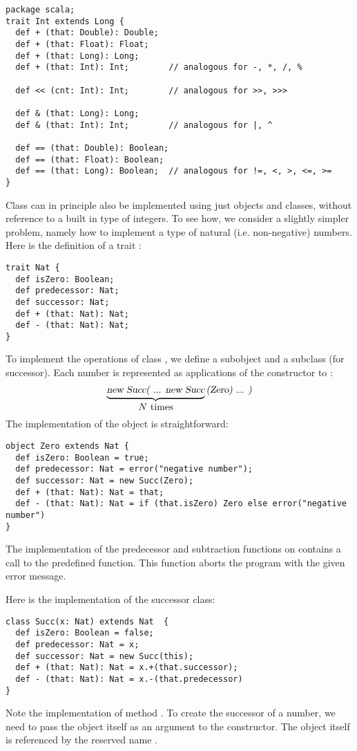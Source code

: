 \documentclass[a4paper,12pt,twoside,titlepage]{book}
\begin{document}
\begin{lstlisting}
package scala;
trait Int extends Long { 
  def + (that: Double): Double;
  def + (that: Float): Float;
  def + (that: Long): Long;
  def + (that: Int): Int;        // analogous for -, *, /, %

  def << (cnt: Int): Int;        // analogous for >>, >>>

  def & (that: Long): Long;
  def & (that: Int): Int;        // analogous for |, ^

  def == (that: Double): Boolean;
  def == (that: Float): Boolean;
  def == (that: Long): Boolean;  // analogous for !=, <, >, <=, >=
}
\end{lstlisting}

Class  can in principle also be implemented using just
objects and classes, without reference to a built in type of
integers. To see how, we consider a slightly simpler problem, namely
how to implement a type  of natural (i.e. non-negative)
numbers. Here is the definition of a trait :
\begin{lstlisting}
trait Nat {
  def isZero: Boolean;
  def predecessor: Nat;
  def successor: Nat;
  def + (that: Nat): Nat;
  def - (that: Nat): Nat;
}
\end{lstlisting}
To implement the operations of class , we define a subobject
 and a subclass  (for successor). Each number
 is represented as  applications of the 
constructor to :
\[
\underbrace{\mbox{\sl new Succ( ... new Succ}}_{\mbox{$N$ times}}\mbox{\sl (Zero) ... )}
\]
The implementation of the  object is straightforward:
\begin{lstlisting}
object Zero extends Nat {
  def isZero: Boolean = true;
  def predecessor: Nat = error("negative number");
  def successor: Nat = new Succ(Zero);
  def + (that: Nat): Nat = that;
  def - (that: Nat): Nat = if (that.isZero) Zero else error("negative number")
}
\end{lstlisting}

The implementation of the predecessor and subtraction functions on
 contains a call to the predefined 
function. This function aborts the program with the given error
message.

Here is the implementation of the successor class:
\begin{lstlisting}
class Succ(x: Nat) extends Nat  {
  def isZero: Boolean = false;
  def predecessor: Nat = x;
  def successor: Nat = new Succ(this);
  def + (that: Nat): Nat = x.+(that.successor);
  def - (that: Nat): Nat = x.-(that.predecessor)
}
\end{lstlisting}
Note the implementation of method . To create the
successor of a number, we need to pass the object itself as an
argument to the  constructor.  The object itself is
referenced by the reserved name .   
\end{document}
